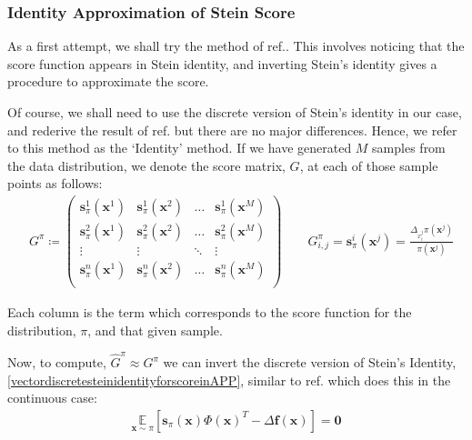 \subsubsection{Identity Approximation of Stein Score} \label{app:identitysteinscore}
As a first attempt, we shall try the method of ref.. This  involves noticing that the score function appears in Stein identity, and inverting Stein's identity gives a procedure to approximate the score.

Of course, we shall need to use the discrete version of Stein's identity in our case, and rederive the result of ref. but there are no major differences. Hence, we refer to this method as the `Identity' method.
If we have generated $M$ samples from the data distribution, we denote the score matrix, $G$, at each of those sample points as follows: 
\begin{align}
&G^{\pi}  \coloneqq \left(\begin{array}{cccc}
    \mathbf{s}^1_\pi(\mathbf{x}^1)  & \mathbf{s}^1_\pi(\mathbf{x}^2)  &\dots &\mathbf{s}^1_\pi(\mathbf{x}^M)   \\
     \mathbf{s}^2_\pi(\mathbf{x}^1)  & \mathbf{s}^2_\pi(\mathbf{x}^2)  &\dots &\mathbf{s}^2_\pi(\mathbf{x}^M)     \\
         \vdots & \vdots &\ddots &\vdots   \\
    \mathbf{s}^n_\pi(\mathbf{x}^1)  & \mathbf{s}^n_\pi(\mathbf{x}^2)  &\dots &\mathbf{s}^n_\pi(\mathbf{x}^M)    \\
\end{array}\right)\label{steinscorematrix}
\qquad G^{\pi}_{i,j} = \mathbf{s}^i_\pi(\mathbf{x}^j) = \frac{\Delta_{x_i^j}\pi(\mathbf{x}^j)}{\pi(\mathbf{x}^j)}
\end{align}

\noindent Each column is the term which corresponds to the score function for the distribution, $\pi$, and that given sample.

Now, to compute, $\hat{G}^{\pi} \approx G^{\pi}$ we can invert the discrete version of Stein's Identity, \eqref{vectordiscretesteinidentityforscoreinAPP}, similar to ref. which does this in the continuous case:
\begin{align}
    \underset{\mathbf{x}\sim \pi}{\mathbb{E}}[\mathbf{s}_{\pi}(\mathbf{x})\Phi(\mathbf{x})^T - \Delta \mathbf{f}(\mathbf{x})] = \mathbf{0} \label{vectordiscretesteinidentityforscoreinAPP}
\end{align}


